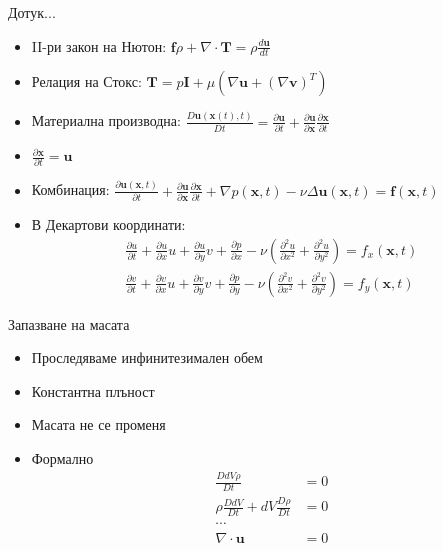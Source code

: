\documentclass{beamer}
\newcommand{\vecf}[1]{\boldsymbol{#1}}
\begin{document}
\begin{frame}{Дотук...}
	\begin{itemize}[<+->]
		\item II-ри закон на Нютон: $\boldsymbol{f}\rho + \nabla \cdot \boldsymbol{T} = \rho\frac{d\boldsymbol{u}}{dt}$
		\item Релация на Стокс: $\boldsymbol{T} = p\boldsymbol{I} + \mu(\nabla\boldsymbol{u} + (\nabla\boldsymbol{v})^T)$
		\item Материална производна: $\frac{D\boldsymbol{u}(\boldsymbol{x}(t), t)}{Dt} = \frac{\partial \boldsymbol{u}}{\partial t} + \frac{\partial \boldsymbol{u}}{\partial \boldsymbol{x}}\frac{\partial \boldsymbol{x}}{\partial t}$
		\item $\frac{\partial \boldsymbol{x}}{\partial t} = \boldsymbol{u}$
		\item Комбинация: $\frac{\partial \vecf{u}(\vecf{x}, t)}{\partial t} + \frac{\partial \boldsymbol{u}}{\partial \boldsymbol{x}}\frac{\partial \boldsymbol{x}}{\partial t} + \nabla p(\vecf{x}, t) - \nu\Delta\vecf{u}(\vecf{x}, t) = \vecf{f}(\vecf{x}, t)$
		\item В Декартови координати:
		\begin{align*}
			\frac{\partial u}{\partial t} + \frac{\partial u}{\partial x}u + \frac{\partial u}{\partial y}v + \frac{\partial p}{\partial x} - \nu\left(\frac{\partial^2 u}{\partial x^2} + \frac{\partial^2 u}{\partial y^2}\right) = f_x(\vecf{x}, t) \\
			\frac{\partial v}{\partial t} + \frac{\partial v}{\partial x}u + \frac{\partial v}{\partial y}v + \frac{\partial p}{\partial y} - \nu\left(\frac{\partial^2 v}{\partial x^2} + \frac{\partial^2 v}{\partial y^2}\right) = f_y(\vecf{x}, t)
		\end{align*}
	\end{itemize}
\end{frame}

\begin{frame}{Запазване на масата}
	\begin{itemize}[<+->]
		\item Проследяваме инфинитезимален обем
		\item Константна плъност
		\item Масата не се променя
		\item Формално 
		\begin{align*}
			\frac{DdV\rho}{Dt} &= 0 \\
			\rho\frac{DdV}{Dt} + dV\frac{D\rho}{Dt} &= 0 \\
			\cdots \\
			\nabla \cdot \boldsymbol{u} &= 0
		\end{align*}
	\end{itemize}
\end{frame}
\end{document}
